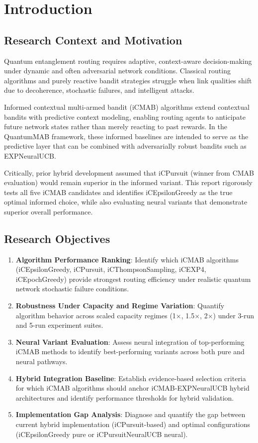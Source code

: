 \documentclass[12pt,a4paper]{article}
\begin{document}
\newpage
\section{Introduction}

\subsection{Research Context and Motivation}
Quantum entanglement routing requires adaptive, context-aware decision-making under dynamic and often adversarial network conditions. Classical routing algorithms and purely reactive bandit strategies struggle when link qualities shift due to decoherence, stochastic failures, and intelligent attacks.

Informed contextual multi-armed bandit (iCMAB) algorithms extend contextual bandits with predictive context modeling, enabling routing agents to anticipate future network states rather than merely reacting to past rewards. In the QuantumMAB framework, these informed baselines are intended to serve as the predictive layer that can be combined with adversarially robust bandits such as EXPNeuralUCB.

Critically, prior hybrid development assumed that iCPursuit (winner from CMAB evaluation) would remain superior in the informed variant. This report rigorously tests all five iCMAB candidates and identifies iCEpsilonGreedy as the true optimal informed choice, while also evaluating neural variants that demonstrate superior overall performance.

\subsection{Research Objectives}
\begin{enumerate}
\item \textbf{Algorithm Performance Ranking}: Identify which iCMAB algorithms (iCEpsilonGreedy, iCPursuit, iCThompsonSampling, iCEXP4, iCEpochGreedy) provide strongest routing efficiency under realistic quantum network stochastic failure conditions.
\item \textbf{Robustness Under Capacity and Regime Variation}: Quantify algorithm behavior across scaled capacity regimes (1$\times$, 1.5$\times$, 2$\times$) under 3-run and 5-run experiment suites.
\item \textbf{Neural Variant Evaluation}: Assess neural integration of top-performing iCMAB methods to identify best-performing variants across both pure and neural pathways.
\item \textbf{Hybrid Integration Baseline}: Establish evidence-based selection criteria for which iCMAB algorithms should anchor iCMAB-EXPNeuralUCB hybrid architectures and identify performance thresholds for hybrid validation.
\item \textbf{Implementation Gap Analysis}: Diagnose and quantify the gap between current hybrid implementation (iCPursuit-based) and optimal configurations (iCEpsilonGreedy pure or iCPursuitNeuralUCB neural).
\end{enumerate}
\end{document}
